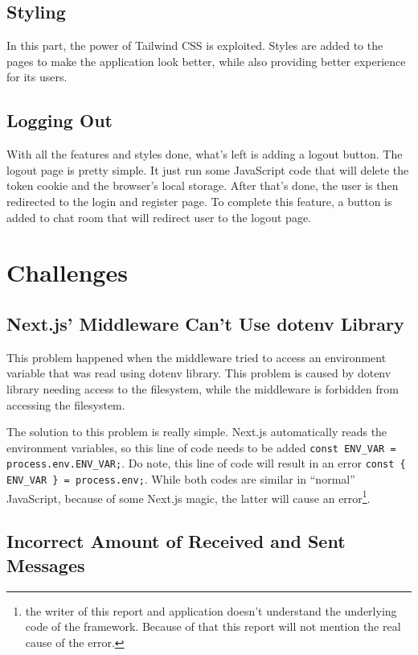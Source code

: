 \documentclass[conference]{IEEEtran}
\begin{document}
\subsection{Styling}

In this part, the power of Tailwind CSS is exploited. Styles are added to the pages to
make the application look better, while also providing better experience for its users.

\subsection{Logging Out}

With all the features and styles done, what's left is adding a logout button. The
logout page is pretty simple. It just run some JavaScript code that will delete the
token cookie and the browser's local storage. After that's done, the user is then
redirected to the login and register page. To complete this feature, a button is added
to chat room that will redirect user to the logout page.

\section{Challenges}

\subsection{Next.js' Middleware Can't Use dotenv Library}

This problem happened when the middleware tried to access an environment variable that
was read using dotenv library. This problem is caused by dotenv library needing access
to the filesystem, while the middleware is forbidden from accessing the filesystem.

The solution to this problem is really simple. Next.js automatically reads the
environment variables, so this line of code needs to be added \texttt{const ENV\_VAR =
process.env.ENV\_VAR;}. Do note, this line of code will result in an error \texttt{const
\{ ENV\_VAR \} = process.env;}. While both codes are similar in ``normal'' JavaScript,
because of some Next.js magic, the latter will cause an error\footnote{the writer of
this report and application doesn't understand the underlying code of the framework.
Because of that this report will not mention the real cause of the error.}.

\subsection{Incorrect Amount of Received and Sent Messages}
\end{document}
